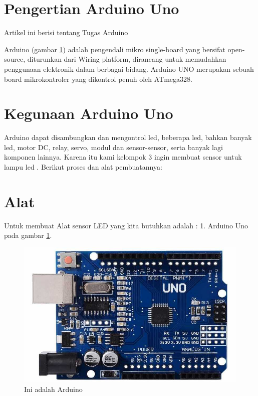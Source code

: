 \section{Pengertian Arduino Uno}

Artikel ini berisi tentang Tugas Arduino
	


Arduino (gambar \ref{fig:arduino}) adalah pengendali mikro single-board yang bersifat open-source, diturunkan dari Wiring platform, dirancang untuk memudahkan penggunaan elektronik dalam berbagai bidang. Arduino UNO merupakan sebuah board mikrokontroler yang dikontrol penuh oleh ATmega328.

\section{Kegunaan Arduino Uno}
Arduino dapat disambungkan dan mengontrol led, beberapa led, bahkan banyak led, motor DC, relay, servo, modul dan sensor-sensor, serta banyak lagi komponen lainnya.
Karena itu kami kelompok 3 ingin membuat sensor untuk lampu led . Berikut proses dan alat pembuatannya:

\section{Alat}
Untuk membuat Alat sensor LED yang kita butuhkan adalah :
 1. Arduino Uno pada gambar \ref{fig:arduino}.
  \begin{figure}[ht]
  \centerline{\includegraphics[width=.75\textwidth]{figures/arduino10.jpg}}
  \caption{Ini adalah Arduino}
  \label{fig:arduino}
  \end{figure}

